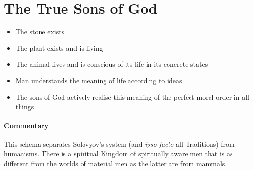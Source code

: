 \section{The True Sons of God}

\begin{quotex}
\begin{itemize}


\item The stone exists

\item The plant exists and is living

\item The animal lives and is conscious of its life in its concrete states

\item Man understands the meaning of life according to ideas

\item The sons of God actively realise this meaning of the perfect moral order in all things
\end{itemize}


\end{quotex}

\paragraph{Commentary}


This schema separates Solovyov's system (and \emph{ipso facto} all Traditions) from humanisms. There is a spiritual Kingdom of spiritually aware men that is as different from the worlds of material men as the latter are from mammals.



